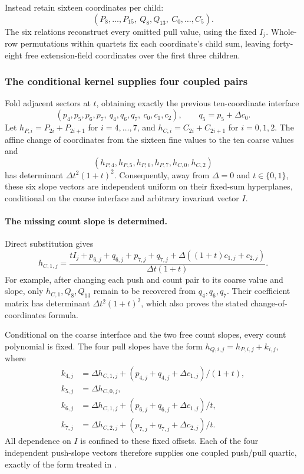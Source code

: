 Instead retain sixteen coordinates per child:
\[
 (P_8,\ldots,P_{15},\ Q_8,Q_{13},\ C_0,\ldots,C_5).
\]
The six relations reconstruct every omitted pull value, using the fixed $I_j$. Whole-row permutations within quartets fix each coordinate's child sum, leaving forty-eight free extension-field coordinates over the first three children.

\subsubsection{The conditional kernel supplies four coupled pairs}

Fold adjacent sectors at $t$, obtaining exactly the previous ten-coordinate interface
\[
 (p_4,p_5,p_6,p_7,\ q_4,q_6,q_7,\ c_0,c_1,c_2),
 \qquad q_5=p_5+\Delta c_0.
\]
Let $h_{P,i}=P_{2i}+P_{2i+1}$ for $i=4,\ldots,7$, and $h_{C,i}=C_{2i}+C_{2i+1}$ for $i=0,1,2$. The affine change of coordinates from the sixteen fine values to the ten coarse values and
\[
 (h_{P,4},h_{P,5},h_{P,6},h_{P,7},h_{C,0},h_{C,2})
\]
has determinant $\Delta t^2(1+t)^2$. Consequently, away from $\Delta=0$ and $t\in\{0,1\}$, these six slope vectors are independent uniform on their fixed-sum hyperplanes, conditional on the coarse interface and arbitrary invariant vector $I$.

\paragraph{The missing count slope is determined.} Direct substitution gives
\[
 h_{C,1,j}=\frac{tI_j+p_{6,j}+q_{6,j}+p_{7,j}+q_{7,j}
             +\Delta((1+t)c_{1,j}+c_{2,j})}{\Delta t(1+t)}.
\]
For example, after changing each push and count pair to its coarse value and slope, only $h_{C,1},Q_8,Q_{13}$ remain to be recovered from $q_4,q_6,q_7$. Their coefficient matrix has determinant $\Delta t^2(1+t)^2$, which also proves the stated change-of-coordinates formula.

Conditional on the coarse interface and the two free count slopes, every count polynomial is fixed. The four pull slopes have the form $h_{Q,i,j}=h_{P,i,j}+k_{i,j}$, where
\[
\begin{aligned}
 k_{4,j}&=\Delta h_{C,1,j}+(p_{4,j}+q_{4,j}+\Delta c_{1,j})/(1+t),\\
 k_{5,j}&=\Delta h_{C,0,j},\\
 k_{6,j}&=\Delta h_{C,1,j}+(p_{6,j}+q_{6,j}+\Delta c_{1,j})/t,\\
 k_{7,j}&=\Delta h_{C,2,j}+(p_{7,j}+q_{7,j}+\Delta c_{2,j})/t.
\end{aligned}
\]
All dependence on $I$ is confined to these fixed offsets. Each of the four independent push-slope vectors therefore supplies one coupled push/pull quartic, exactly of the form treated in .

